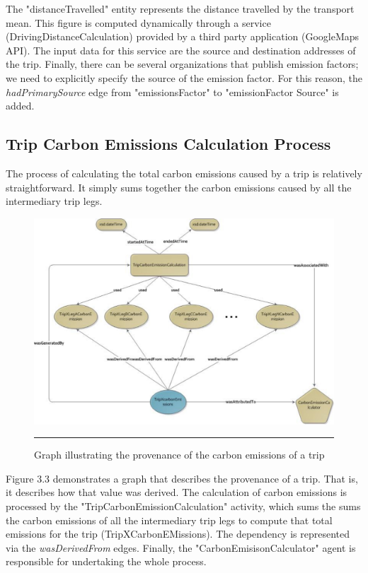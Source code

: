 The "distanceTravelled" entity represents the distance travelled by the transport mean. This figure is computed dynamically through a service (DrivingDistanceCalculation) provided by a third party application (GoogleMaps API). The input data for this service are the source and destination addresses of the trip. Finally, there can be several organizations that publish emission factors; we need to explicitly specify the source of the emission factor. For this reason, the \emph{hadPrimarySource} edge from "emissionsFactor" to "emissionFactor Source" is added.


\subsection{Trip Carbon Emissions Calculation Process}

The process of calculating the total carbon emissions caused by a trip is relatively straightforward. It simply sums together the carbon emissions caused by all the intermediary trip legs.

\begin{figure}[htbp]
	\centering
		\includegraphics[scale=0.40]{./Figures/chapter3/figure3.pdf}
		\rule{35em}{0.5pt}
	\caption[ Graph illustrating the provenance of the carbon emissions of a trip]{ Graph illustrating the provenance of the carbon emissions of a trip}
	\label{fig:provTripCo2Graph}
\end{figure}

Figure 3.3 demonstrates a graph that describes the provenance of a trip. That is, it describes how that value was derived. The calculation of carbon emissions is processed by the "TripCarbonEmissionCalculation" activity, which sums the sums the carbon emissions of all the intermediary trip legs to compute that total emissions for the trip (TripXCarbonEMissions).  The dependency is represented via the \emph{wasDerivedFrom} edges. Finally, the "CarbonEmisisonCalculator" agent is responsible for undertaking the whole process.

